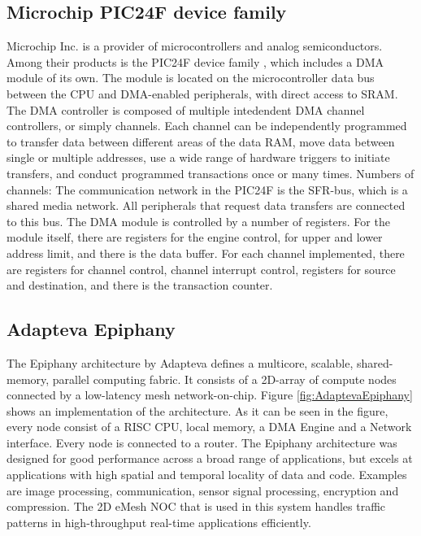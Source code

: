\subsection{Microchip PIC24F device family}
Microchip Inc. is a provider of microcontrollers and analog semiconductors.
Among their products is the PIC24F device family \cite{microchip1}, which includes a DMA module of its own\cite{microchip54}.
The module is located on the microcontroller data bus between the CPU and DMA-enabled peripherals, with direct access to SRAM.
The DMA controller is composed of multiple intedendent DMA channel controllers, or simply channels.
Each channel can be independently programmed to transfer data between different areas of the data RAM, move data between single or multiple addresses, use a wide range of hardware triggers to initiate transfers, and conduct programmed transactions once or many times. 
Numbers of channels: 
The communication network in the PIC24F is the SFR-bus, which is a shared media network.
All peripherals that request data transfers are connected to this bus.
The DMA module is controlled by a number of registers.
For the module itself, there are registers for the engine control, for upper and lower address limit, and there is the data buffer.
For each channel implemented, there are registers for channel control, channel interrupt control, registers for source and destination, and there is the transaction counter. 

\subsection{Adapteva Epiphany}
The Epiphany architecture by Adapteva \cite{epiphany} defines a multicore, scalable, shared-memory, parallel computing fabric.
It consists of a 2D-array of compute nodes connected by a low-latency mesh network-on-chip.
Figure \ref{fig:AdaptevaEpiphany} shows an implementation of the architecture.
As it can be seen in the figure, every node consist of a RISC CPU, local memory, a DMA Engine and a Network interface.
Every node is connected to a router.
The Epiphany architecture was designed for good performance across a broad range of applications, but excels at applications with high spatial and temporal locality of data and code.
Examples are image processing, communication, sensor signal processing, encryption and compression.
The 2D eMesh NOC that is used in this system handles traffic patterns in high-throughput real-time applications efficiently.

